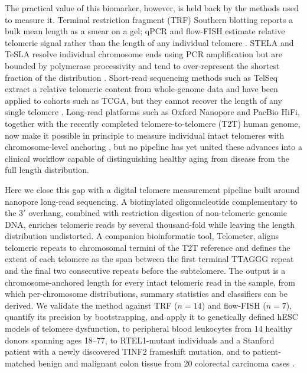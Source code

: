 \documentclass[11pt]{article}
\begin{document}
The practical value of this biomarker, however, is held back by the
methods used to measure it. Terminal restriction fragment (TRF)
Southern blotting reports a bulk mean length as a smear on a gel; qPCR
and flow-FISH estimate relative telomeric signal rather than the length
of any individual telomere
\citep{aubert2012telomere,baerlocher2006flow,cawthon2002telomere}.
STELA and TeSLA resolve individual chromosome ends using PCR
amplification but are bounded by polymerase processivity and tend to
over-represent the shortest fraction of the distribution
\citep{baird2003extensive,lai2018comparison}. Short-read sequencing
methods such as TelSeq extract a relative telomeric content from
whole-genome data and have been applied to cohorts such as TCGA, but
they cannot recover the length of any single telomere
\citep{ding2014telseq,barthel2017systematic,demanelis2020determinants}.
Long-read platforms such as Oxford Nanopore and PacBio HiFi, together
with the recently completed telomere-to-telomere (T2T) human genome, now
make it possible in principle to measure individual intact telomeres
with chromosome-level anchoring
\citep{nurk2022complete,tham2023comprehensive,schmidt2023targeted,karimian2024human,heller2019telomeres},
but no pipeline has yet united these advances into a clinical workflow
capable of distinguishing healthy aging from disease from the full
length distribution.

Here we close this gap with a digital telomere measurement pipeline
built around nanopore long-read sequencing. A biotinylated
oligonucleotide complementary to the 3$'$ overhang, combined with
restriction digestion of non-telomeric genomic DNA, enriches telomeric
reads by several thousand-fold while leaving the length distribution
undistorted. A companion bioinformatic tool, Telometer, aligns telomeric
repeats to chromosomal termini of the T2T reference and defines the
extent of each telomere as the span between the first terminal TTAGGG
repeat and the final two consecutive repeats before the subtelomere.
The output is a chromosome-anchored length for every intact telomeric
read in the sample, from which per-chromosome distributions, summary
statistics and classifiers can be derived. We validate the method against
TRF ($n{=}14$) and flow-FISH ($n{=}7$), quantify its precision by
bootstrapping, and apply it to genetically defined hESC models of
telomere dysfunction, to peripheral blood leukocytes from 14 healthy
donors spanning ages 18--77, to RTEL1-mutant individuals and a Stanford
patient with a newly discovered TINF2 frameshift mutation, and to
patient-matched benign and malignant colon tissue from 20 colorectal
carcinoma cases
\citep{walne2013constitutional,tummala2015poly,savage2008tinf2,alder2018diagnostic}.
\end{document}

